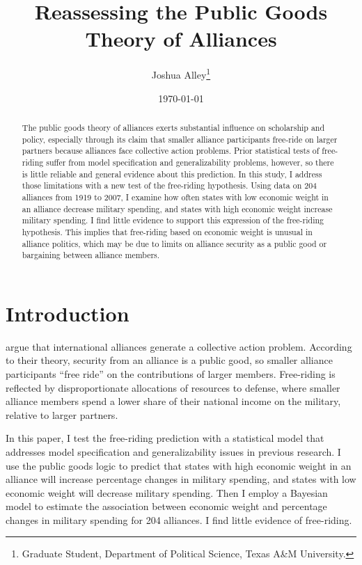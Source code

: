 \documentclass[12pt]{article}
\title{
\textbf{Reassessing the Public Goods Theory of Alliances}
	}
\author{Joshua Alley\footnote{Graduate Student,
Department of Political Science, Texas A\&M University.}}
\date{{\normalsize \today}}
\begin{document}
\maketitle 

\doublespace

\begin{abstract}
The public goods theory of alliances exerts substantial influence on scholarship and policy, especially through its claim that smaller alliance participants free-ride on larger partners because alliances face collective action problems. 
Prior statistical tests of free-riding suffer from model specification and generalizability problems, however, so there is little reliable and general evidence about this prediction.
In this study, I address those limitations with a new test of the free-riding hypothesis. 
Using data on 204 alliances from 1919 to 2007, I examine how often states with low economic weight in an alliance decrease military spending, and states with high economic weight increase military spending. 
I find little evidence to support this expression of the free-riding hypothesis. 
This implies that free-riding based on economic weight is unusual in alliance politics, which may be due to limits on alliance security as a public good or bargaining between alliance members. 
\end{abstract} 

\newpage


\section{Introduction}



\citet{OlsonZeckhauser1966} argue that international alliances generate a collective action problem. 
According to their theory, security from an alliance is a public good, so smaller alliance participants ``free ride'' on the contributions of larger members. 
Free-riding is reflected by disproportionate allocations of resources to defense, where smaller alliance members spend a lower share of their national income on the military, relative to larger partners.


In this paper, I test the free-riding prediction with a statistical model that addresses model specification and generalizability issues in previous research. 
I use the public goods logic to predict that states with high economic weight in an alliance will increase percentage changes in military spending, and states with low economic weight will decrease military spending.
Then I employ a Bayesian model to estimate the association between economic weight and percentage changes in military spending for 204 alliances. 
I find little evidence of free-riding. 
\end{document}
